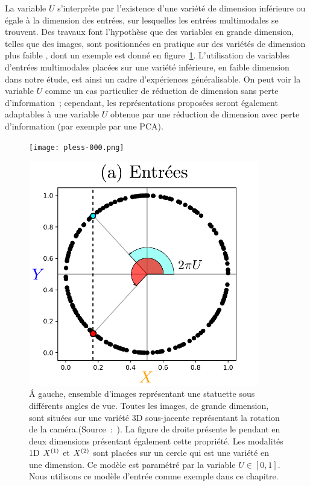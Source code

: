 \documentclass[../main]{subfiles}
\begin{document}
La variable $U$ s'interprète par l'existence d'une variété de dimension inférieure ou égale à la dimension des entrées, sur lesquelles les entrées multimodales se trouvent.
Des travaux font l'hypothèse que des variables en grande dimension, telles que des images, sont positionnées en pratique sur des variétés de dimension plus faible \cite{Pless2009ASO}, dont un exemple est donné en figure~\ref{fig:U}.
L'utilisation de variables d'entrées multimodales placées sur une variété inférieure, en faible dimension dans notre étude, est ainsi un cadre d'expériences généralisable.
On peut voir la variable $U$ comme un cas particulier de réduction de dimension sans perte d'information~; cependant, les représentations proposées seront également adaptables à une variable $U$ obtenue par une réduction de dimension avec perte d'information (par exemple par une PCA). 

\begin{figure}
    \begin{minipage}{0.4\textwidth}
    \centering
    \texttt{[image: pless-000.png]}
    \end{minipage}
    \begin{minipage}{0.6\textwidth}
    \centering
    \includegraphics[width=0.9\textwidth]{2som_inp.pdf}
    \end{minipage}
    \caption{
        \'A gauche, ensemble d'images représentant une statuette sous différents angles de vue. Toutes les images, de grande dimension, sont situées sur une variété 3D sous-jacente représentant la rotation de la caméra.(Source~:~\cite{Pless2009ASO}).
       La figure de droite présente le pendant en deux dimensions présentant également cette propriété. Les modalités 1D $X^{({1})}$ et $X^{({2})}$ sont placées sur un cercle qui est une variété en une dimension. Ce modèle est paramétré par la variable $U \in [0,1]$. Nous utilisons ce modèle d'entrée comme exemple dans ce chapitre.
       \label{fig:U}}
\end{figure}
\end{document}

